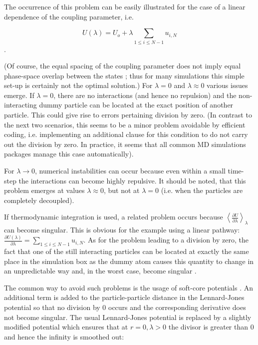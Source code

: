 The occurrence of this problem can be easily illustrated for the case
of a linear dependence of the coupling parameter,
i.e.

\[
U\left(\lambda\right)=U_{o}+\lambda\sum_{1\leq i\leq N-1}u_{i,N}
\]
.

(Of course, the equal spacing of the coupling parameter does not imply
equal phase-space overlap between the states \cite{Shirts.2013};
thus for many simulations this simple set-up is certainly not the
optimal solution.) For $\lambda=0$ and $\lambda\approx0$ various
issues emerge. If $\lambda=0$, there are no interactions (and hence
no repulsion) and the non-interacting dummy particle can be located
at the exact position of another particle. This could give rise to
errors pertaining division by zero. (In contrast to the next two scenarios,
this seems to be a minor problem avoidable by efficient coding, i.e.
implementing an additional clause for this condition to do not carry
out the division by zero. In practice, it seems that all common MD
simulations packages manage this case automatically\cite{Boresch.2011}).

For $\lambda\rightarrow0$, numerical instabilities can occur because
even within a small time-step the interactions can become highly repulsive.
It should be noted, that this problem emerges at values $\lambda\approx0$,
but not at $\lambda=0$ (i.e. when the particles are completely decoupled).

If thermodynamic integration is used, a related problem occurs because
$\left\langle \frac{\partial U}{\partial\lambda}\right\rangle _{\lambda}$can
become singular. This is obvious for the example using a linear pathway:
$\frac{\partial U\left(\lambda\right)}{\partial\lambda}=\sum_{1\leq i\leq N-1}u_{i,N}$.
As for the problem leading to a division by zero, the fact that one of the
still interacting particles can be located at exactly the same place
in the simulation box as the dummy atom causes this quantity to change
in an unpredictable way and, in the worst case, become singular \cite{Boresch.2011}.

The common way to avoid such problems is the usage of soft-core potentials \cite{Steinbrecher.2011}.
An additional term is added to the particle-particle distance in the Lennard-Jones potential so that
no division by 0 occurs and the corresponding derivative does not
become singular. The usual Lennard-Jones potential is replaced by
a slightly modified potential which ensures that at $r=0,\lambda>\text{0}$
the divisor is greater than 0 and hence the infinity is smoothed out:

